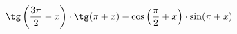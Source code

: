 \begin{ex}[type=expression]
	\begin{condition}
		\( \tg\left( \dfrac{3\pi}{2}-x \right)\cdot\tg(\pi+x)-\cos\left( \dfrac{\pi}{2}+x \right)\cdot\sin(\pi+x) \)
	\end{condition}
\end{ex}